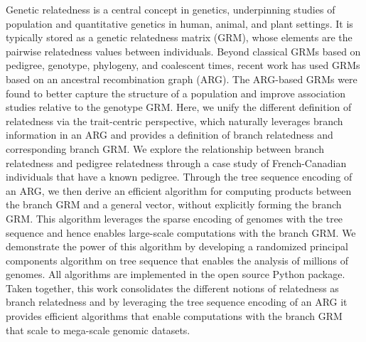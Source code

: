 Genetic relatedness is a central concept in genetics,
underpinning studies of population and quantitative genetics in human, animal, and plant settings.
%
It is typically stored as a genetic relatedness matrix (GRM),
whose elements are the pairwise relatedness values between individuals.
%
Beyond classical GRMs based on pedigree, genotype, phylogeny, and coalescent times,
recent work has used GRMs based on an ancestral recombination graph (ARG).
%
The ARG-based GRMs were found to better capture the structure of a population and
improve association studies relative to the genotype GRM.
%
Here, we unify the different definition of relatedness via the trait-centric perspective, which naturally leverages branch information in an ARG and provides a definition of branch relatedness and corresponding branch GRM.
%
We explore the relationship between branch relatedness and pedigree relatedness through a case study of French-Canadian individuals that have a known pedigree.
%
Through the tree sequence encoding of an ARG, we then derive an efficient algorithm for computing products between the branch GRM and a general vector, without explicitly forming the branch GRM.
%
This algorithm leverages the sparse encoding of genomes with the tree sequence and hence enables large-scale computations with the branch GRM.
%
We demonstrate the power of this algorithm by developing
a randomized principal components algorithm on tree sequence
that enables the analysis of millions of genomes.
%
All algorithms are implemented in the open source \tskit{} Python package.
%
Taken together, this work consolidates the different notions of relatedness as branch relatedness
and by leveraging the tree sequence encoding of an ARG it provides efficient algorithms
that enable computations with the branch GRM that scale to mega-scale genomic datasets.
